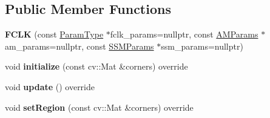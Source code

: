 \subsection*{Public Member Functions}
\begin{DoxyCompactItemize}
\item 
\hypertarget{classFCLK_ab576a57be4effa4634db54c8520d95f8}{{\bfseries F\-C\-L\-K} (const \hyperlink{structFCLKParams}{Param\-Type} $\ast$fclk\-\_\-params=nullptr, const \hyperlink{structAMParams}{A\-M\-Params} $\ast$am\-\_\-params=nullptr, const \hyperlink{structSSMParams}{S\-S\-M\-Params} $\ast$ssm\-\_\-params=nullptr)}\label{classFCLK_ab576a57be4effa4634db54c8520d95f8}

\item 
\hypertarget{classFCLK_a9bd3f486a633286c19a13c68b9d119c2}{void {\bfseries initialize} (const cv\-::\-Mat \&corners) override}\label{classFCLK_a9bd3f486a633286c19a13c68b9d119c2}

\item 
\hypertarget{classFCLK_ab22a424466a2e49de4e2817d776222c8}{void {\bfseries update} () override}\label{classFCLK_ab22a424466a2e49de4e2817d776222c8}

\item 
\hypertarget{classFCLK_aa4605cd9189de98673a1966b34e1791d}{void {\bfseries set\-Region} (const cv\-::\-Mat \&corners) override}\label{classFCLK_aa4605cd9189de98673a1966b34e1791d}

\end{DoxyCompactItemize}
